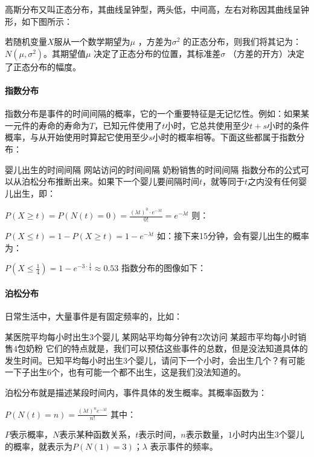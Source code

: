 \documentclass[11pt]{book}
\newcounter{#2}
\newcounter{#2}[#1]
\numberwithin{#2}{#1}
\begin{document}
高斯分布又叫正态分布，其曲线呈钟型，两头低，中间高，左右对称因其曲线呈钟形，如下图所示：


若随机变量$ X $服从一个数学期望为$ \mu $ ，方差为$ \sigma ^{2} $ 的正态分布，则我们将其记为：$ N\left( \mu ,\sigma^{2}  \right)  $。其期望值$ \mu $ 决定了正态分布的位置，其标准差$ \sigma $ （方差的开方）决定了正态分布的幅度。

\paragraph{指数分布}

指数分布是事件的时间间隔的概率，它的一个重要特征是无记忆性。例如：如果某一元件的寿命的寿命为$ T $，已知元件使用了$ t $小时，它总共使用至少$ t+s $小时的条件概率，与从开始使用时算起它使用至少$ s $小时的概率相等。下面这些都属于指数分布：

婴儿出生的时间间隔
网站访问的时间间隔
奶粉销售的时间间隔 
指数分布的公式可以从泊松分布推断出来。如果下一个婴儿要间隔时间$ t $，就等同于$ t $之内没有任何婴儿出生，即：

$ P\left( X\geq t \right) =P\left( N\left( t \right) =0 \right) =\frac{\left( \lambda t \right) ^{0}\cdot e^{-\lambda t}  }{0!}=e^{-\lambda t} $ 
则：

$ P\left( X\leq t \right) =1-P\left( X\geq t \right) =1-e^{-\lambda t}  $
如：接下来15分钟，会有婴儿出生的概率为：

$ P\left( X\leq \frac{1}{4} \right) =1-e^{-3\cdot \frac{1}{4} } \approx 0.53 $
指数分布的图像如下：


\paragraph{泊松分布}

日常生活中，大量事件是有固定频率的，比如：

某医院平均每小时出生3个婴儿
某网站平均每分钟有2次访问
某超市平均每小时销售4包奶粉 
它们的特点就是，我们可以预估这些事件的总数，但是没法知道具体的发生时间。已知平均每小时出生3个婴儿，请问下一个小时，会出生几个？有可能一下子出生6个，也有可能一个都不出生，这是我们没法知道的。

泊松分布就是描述某段时间内，事件具体的发生概率。其概率函数为：

$ P\left( N\left( t \right) =n \right) =\frac{\left( \lambda t \right) ^{n}e^{-\lambda t}  }{n!}  $
其中：

$ P $表示概率，$ N $表示某种函数关系，$ t $表示时间，$ n $表示数量，$ 1 $小时内出生3个婴儿的概率，就表示为$  P(N(1) = 3)  $；$ λ $ 表示事件的频率。
\end{document}
